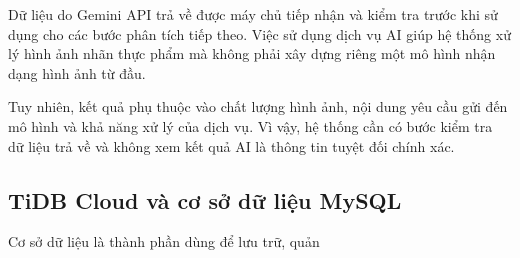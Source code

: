 	Dữ liệu do Gemini API trả về được máy chủ tiếp nhận và kiểm tra
	trước khi sử dụng cho các bước phân tích tiếp theo. Việc sử dụng
	dịch vụ AI giúp hệ thống xử lý hình ảnh nhãn thực phẩm mà không
	phải xây dựng riêng một mô hình nhận dạng hình ảnh từ đầu.
	
	Tuy nhiên, kết quả phụ thuộc vào chất lượng hình ảnh, nội dung
	yêu cầu gửi đến mô hình và khả năng xử lý của dịch vụ. Vì vậy,
	hệ thống cần có bước kiểm tra dữ liệu trả về và không xem kết
	quả AI là thông tin tuyệt đối chính xác.
	
	\subsection{TiDB Cloud và cơ sở dữ liệu MySQL}
	
	Cơ sở dữ liệu là thành phần dùng để lưu trữ, quản